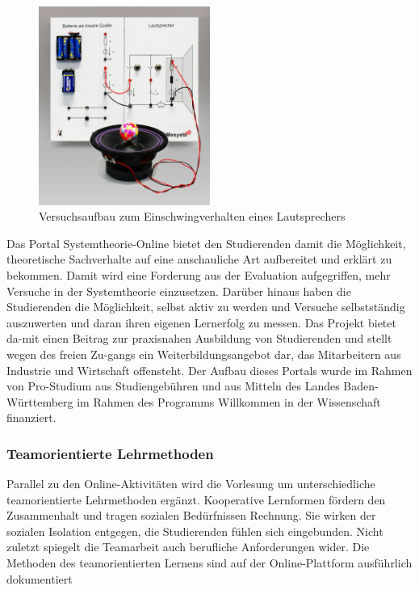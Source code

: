 \begin{figure}[H]
  \centerline{\includegraphics[width=0.5\textwidth]{Einleitung/Bilder/image4}}
  \caption{Versuchsaufbau zum Einschwingverhalten eines Lautsprechers}
  \label{fig:EinschwingverhaltenLautsprecher}
\end{figure}

\noindent Das Portal Systemtheorie-Online bietet den Studierenden damit die Möglichkeit, theoretische Sachverhalte auf eine anschauliche Art aufbereitet und erklärt zu bekommen. Damit wird eine Forderung aus der Evaluation aufgegriffen, mehr Versuche in der Systemtheorie einzusetzen. Darüber hinaus haben die Studierenden die Möglichkeit, selbst aktiv zu werden und Versuche selbstständig auszuwerten und daran ihren eigenen Lernerfolg zu messen. Das Projekt bietet da-mit einen Beitrag zur praxisnahen Ausbildung von Studierenden und stellt wegen des freien Zu-gangs ein Weiterbildungsangebot dar, das Mitarbeitern aus Industrie und Wirtschaft offensteht. Der Aufbau dieses Portals wurde im Rahmen von Pro-Studium aus Studiengebühren und aus Mitteln des Landes Baden-Württemberg im Rahmen des Programms Willkommen in der Wissenschaft finanziert.

\subsubsection{Teamorientierte Lehrmethoden}

\noindent Parallel zu den Online-Aktivitäten wird die Vorlesung um unterschiedliche teamorientierte Lehrmethoden ergänzt. Kooperative Lernformen fördern den Zusammenhalt und tragen sozialen Bedürfnissen Rechnung. Sie wirken der sozialen Isolation entgegen, die Studierenden fühlen sich eingebunden. Nicht zuletzt spiegelt die Teamarbeit auch berufliche Anforderungen wider. Die Methoden des teamorientierten Lernens sind auf der Online-Plattform ausführlich dokumentiert
\bigskip

